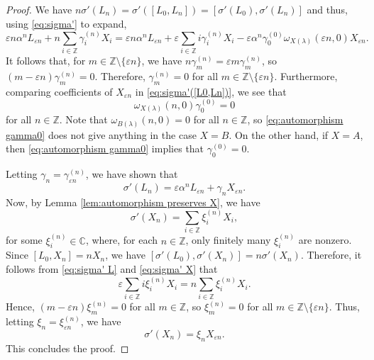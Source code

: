 \documentclass[11pt, svgnames]{amsart}
\newcommand{\ZZ}{\mathbb{Z}}
\newcommand{\CC}{\mathbb{C}}
\theoremstyle{definition}
\begin{document}
\begin{proof}
    We have $n\sigma'(L_n) = \sigma'([L_0,L_n]) = [\sigma'(L_0),\sigma'(L_n)]$ and thus, using \eqref{eq:sigma'} to expand,
    \begin{equation}\label{eq:sigma'([L0,Ln])}
        \varepsilon n \alpha^n L_{\varepsilon n} + n \sum_{i \in \ZZ} \gamma_i^{(n)} X_i = \varepsilon n \alpha^n L_{\varepsilon n} + \varepsilon \sum_{i \in \ZZ} i \gamma_i^{(n)} X_i - \varepsilon \alpha^n \gamma_0^{(0)} \omega_{X(\lambda)}(\varepsilon n,0) X_{\varepsilon n}.
    \end{equation}
    It follows that, for $m \in \ZZ \setminus \{\varepsilon n\}$, we have $n \gamma_m^{(n)} = \varepsilon m \gamma_m^{(n)}$, so $(m - \varepsilon n)\gamma_m^{(n)} = 0$. Therefore, $\gamma_m^{(n)} = 0$ for all $m \in \ZZ \setminus \{\varepsilon n\}$. Furthermore, comparing coefficients of $X_{\varepsilon n}$ in \eqref{eq:sigma'([L0,Ln])}, we see that
    \begin{equation}\label{eq:automorphism gamma0}
        \omega_{X(\lambda)}(n,0) \gamma_0^{(0)} = 0
    \end{equation}
    for all $n \in \ZZ$. Note that $\omega_{B(\lambda)}(n,0) = 0$ for all $n \in \ZZ$, so \eqref{eq:automorphism gamma0} does not give anything in the case $X = B$. On the other hand, if $X = A$, then \eqref{eq:automorphism gamma0} implies that $\gamma_0^{(0)} = 0$.
    
    Letting $\gamma_n = \gamma_{\varepsilon n}^{(n)}$, we have shown that
    \begin{equation}\label{eq:sigma' L}
        \sigma'(L_n) = \varepsilon \alpha^n L_{\varepsilon n} + \gamma_n X_{\varepsilon n}.
    \end{equation}
    Now, by Lemma \ref{lem:automorphism preserves X}, we have
    \begin{equation}\label{eq:sigma' X}
        \sigma'(X_n) = \sum_{i \in \ZZ} \xi_i^{(n)} X_i,
    \end{equation}
    for some $\xi_i^{(n)} \in \CC$, where, for each $n \in \ZZ$, only finitely many $\xi_i^{(n)}$ are nonzero. Since $[L_0,X_n] = nX_n$, we have $[\sigma'(L_0),\sigma'(X_n)] = n\sigma'(X_n)$. Therefore, it follows from \eqref{eq:sigma' L} and \eqref{eq:sigma' X} that
    $$\varepsilon \sum_{i \in \ZZ} i \xi_i^{(n)} X_i = n\sum_{i \in \ZZ} \xi_i^{(n)} X_i.$$
    Hence, $(m - \varepsilon n)\xi_m^{(n)} = 0$ for all $m \in \ZZ$, so $\xi_m^{(n)} = 0$ for all $m \in \ZZ \setminus \{\varepsilon n\}$. Thus, letting $\xi_n = \xi_{\varepsilon n}^{(n)}$, we have
    $$\sigma'(X_n) = \xi_n X_{\varepsilon n}.$$
    This concludes the proof.
\end{proof}
\end{document}
